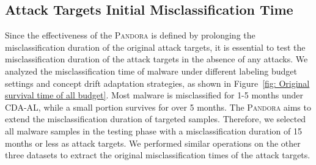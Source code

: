 \documentclass[lettersize,journal]{IEEEtran}
\newcommand{\pandora}{{\scshape Pandora}\xspace}
\begin{document}
\begin{itemize}[leftmargin=*]
\end{itemize}



\subsection*{Attack Targets Initial Misclassification Time}
\label{Sec: Attack Target Initial Survival Time (APIGraph)}
Since the effectiveness of the \pandora is defined by prolonging the misclassification duration of the original attack targets, it is essential to test the misclassification duration of the attack targets in the absence of any attacks.
We analyzed the misclassification time of malware under different labeling budget settings and concept drift adaptation strategies, as shown in Figure~\ref{fig: Original survival time of all budget}.
Most malware is misclassified for 1-5 months under CDA-AL, while a small portion survives for over 5 months.
The \pandora aims to extend the misclassification duration of targeted samples. 
Therefore, we selected all malware samples in the testing phase with a misclassification duration of 15 months or less as attack targets.
We performed similar operations on the other three datasets to extract the original misclassification times of the attack targets.
\end{document}
